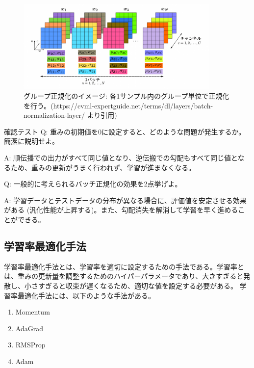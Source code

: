 \documentclass{ltjsarticle}
\begin{document}
\begin{figure}[htbp]
  \centering
  \includegraphics[width=10cm]{./capture/Instance_Normalization.png}
  \caption{グループ正規化のイメージ: 各1サンプル内のグループ単位で正規化を行う。(https://cvml-expertguide.net/terms/dl/layers/batch-normalization-layer/ より引用)}
  \label{fig:Group_Normalization}
\end{figure}




\begin{itembox}[l]{確認テスト}
  Q: 重みの初期値を0に設定すると、どのような問題が発生するか。簡潔に説明せよ。

  A: 順伝播での出力がすべて同じ値となり、逆伝搬での勾配もすべて同じ値となるため、重みの更新がうまく行われず、学習が進まなくなる。

  Q: 一般的に考えられるバッチ正規化の効果を2点挙げよ。

  A: 学習データとテストデータの分布が異なる場合に、評価値を安定させる効果がある (汎化性能が上昇する)。また、勾配消失を解消して学習を早く進めることができる。
\end{itembox}



\subsection{学習率最適化手法}
学習率最適化手法とは、学習率を適切に設定するための手法である。学習率とは、重みの更新量を調整するためのハイパーパラメータであり、大きすぎると発散し、小さすぎると収束が遅くなるため、適切な値を設定する必要がある。
学習率最適化手法には、以下のような手法がある。
\begin{enumerate}
  \item Momentum
  \item AdaGrad
  \item RMSProp
  \item Adam
\end{enumerate}
\end{document}
